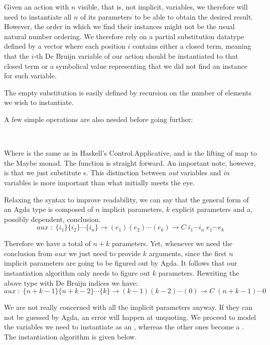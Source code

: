 Given an action with $n$ visible, that is, not implicit, variables, we therefore will need to instantiate all $n$ of its parameters to be able to
obtain the desired result. However, the order in which we find their instances
might not be the usual natural number ordering. We therefore rely on a
partial substitution datatype defined by a vector where each position $i$ contains
either a closed term, meaning that the $i$-th De Bruijn variable of our action should be instantiated to that closed term or a symbolical value representing that we did not find an instance for such variable.


The empty substitution is easily defined by recursion on the number of elements we wish to instantiate.


A few simple operations are also needed before going further:

\\

Where \F{$\_<\$>\_$} is the same as in Haskell's Control.Applicative, and  is the lifting of map to the Maybe monad. The  function is straight forward. An important note, however, is that we just substitute s. This distinction between \emph{out} variables and \emph{in} variables is more important than what initially meets the eye. 

Relaxing the syntax to improve readability, we can say that the general form of an Agda type is composed of $n$ implicit parameters, $k$ explicit parameters and a, possibly dependent, conclusion.
\[
aux\;:\;\{ i_1 \}\{ i_2 \} \cdots \{ i_n \} \rightarrow ( e_1 )( e_2) \cdots (e_k) \rightarrow C\;i_1\cdots i_n\;e_1\cdots e_k
\]

Therefore we have a total of $n+k$ parameters. Yet, whenever we need the conclusion from $aux$ we just need to provide $k$ arguments, since the first
$n$ implicit parameters are going to be figured out by Agda. It follows that our instantiation algorithm only needs to figure out $k$ parameters. Rewriting the above type with De Bruijn indices we have:
\[
aux\;:\;\{ n+k - 1 \}\{ n+k - 2\} \cdots \{ k \} \rightarrow (k-1)(k-2) \cdots (0) \rightarrow C\;(n+k - 1) \cdots 0
\]

We are not really concerned with all the implicit parameters anyway. If they can not be guessed by Agda, an error will happen at unquoting. We proceed to
model the variables we need to instantiate as an , whereas the other ones become a . The instantiation algorithm is given below. 

